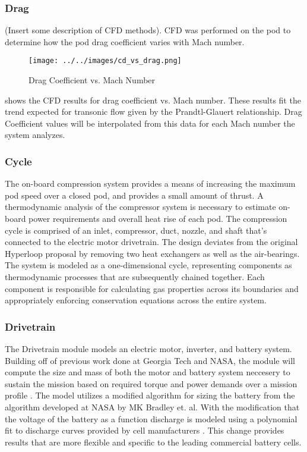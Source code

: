 \subsubsection{Drag}
	(Insert some description of CFD methods).
	CFD was performed on the pod to determine how the pod drag coefficient varies with Mach number.
	\begin{figure}
		\centering
		\texttt{[image: ../../images/cd\_vs\_drag.png]}
		\caption{Drag Coefficient vs. Mach Number}
		\label{fig:cd_vs_mach}
	\end{figure}
	 shows the CFD results for drag coefficient vs. Mach number. These results fit the trend expected for transonic flow given by the Prandtl-Glauert relationship. Drag Coefficient values will be interpolated from this data for each Mach number the system analyzes.
\subsubsection{Cycle}
	The on-board compression system provides a means of increasing the maximum pod speed over a closed pod,  and provides a small amount of thrust. A thermodynamic analysis of the compressor system is necessary to estimate on- board power requirements and overall heat rise of each pod. The compression cycle is comprised of an inlet, compressor, duct, nozzle, and shaft that's connected to the electric motor drivetrain. The design deviates from the original Hyperloop proposal by removing two heat exchangers as well as the air-bearings. The system is modeled as a one-dimensional cycle, representing components as thermodynamic processes that are subsequently chained together. Each component is responsible for calculating gas properties across its boundaries and appropriately enforcing conservation equations across the entire system.
\subsubsection{Drivetrain}
	The Drivetrain module models an electric motor, inverter, and battery system. Building off of previous work done at Georgia Tech and NASA, the module will compute the size and mass of both the motor and battery system neccesery to sustain the mission based on required torque and power demands over a mission profile \cite{GeorgiaTechMotor, NASASugar}. The model utilizes a modified algorithm for sizing the battery from the algorithm developed at NASA by MK Bradley et. al. With the modification that the voltage of the battery as a function discharge is modeled using a polynomial fit to discharge curves provided by cell manufacturers \cite{NASASugar}. This change provides results that are more flexible and specific to the leading commercial battery cells.
